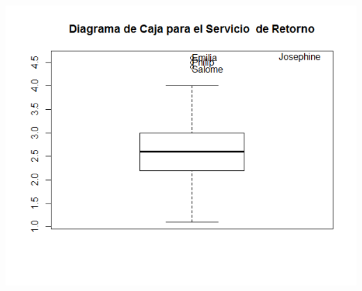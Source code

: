 \documentclass[11pt,a4paper]{article}
\begin{document}
\begin{itemize}
\begin{itemize}
\begin{center}
\includegraphics[scale=0.6]{box_servicio_retorno.png}
\end{center}


\end{itemize}
\end{itemize}
\end{document}
